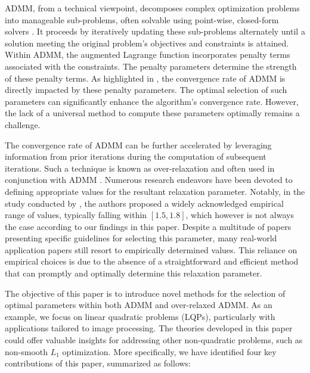 \documentclass[letterpaper]{article} %
\begin{document}
ADMM, from a technical viewpoint, decomposes complex optimization problems into manageable sub-problems, often solvable using point-wise, closed-form solvers \cite{candes2011robust,lu2016implementation,thorley2021nesterov,jia2021learning,duan2023arbitrary}. It proceeds by iteratively updating these sub-problems alternately until a solution meeting the original problem's objectives and constraints is attained. Within ADMM, the augmented Lagrange function incorporates penalty terms associated with the constraints. The penalty parameters determine the strength of these penalty terms. As highlighted in \cite{deng2016global}, the convergence rate of ADMM is directly impacted by these penalty parameters. The optimal selection of such parameters can significantly enhance the algorithm's convergence rate. However, the lack of a universal method to compute these parameters optimally remains a challenge.

The convergence rate of ADMM can be further accelerated by leveraging information from prior iterations during the computation of subsequent iterations. Such a technique is known as over-relaxation and often used in conjunction with ADMM \cite{de1986relaxed,zhang2020privacy}. Numerous research endeavors have been devoted to defining appropriate values for the resultant relaxation parameter. Notably, in the study conducted by \cite{eckstein1994parallel}, the authors proposed a widely acknowledged empirical range of values, typically falling within $[1.5, 1.8]$, which however is not always the case according to our findings in this paper. Despite a multitude of papers presenting specific guidelines for selecting this parameter, many real-world application papers \cite{stellato2020osqp,duan2023arbitrary} still resort to empirically determined values. This reliance on empirical choices is due to the absence of a straightforward and efficient method that can promptly and optimally determine this relaxation parameter.

The objective of this paper is to introduce novel methods for the selection of optimal parameters within both ADMM and over-relaxed ADMM. As an example, we focus on linear quadratic problems (LQPs), particularly with applications tailored to image processing. The theories developed in this paper could offer valuable insights for addressing other non-quadratic problems, such as non-smooth $L_1$ optimization. More specifically, we have identified four key contributions of this paper, summarized as follows:
\end{document}
